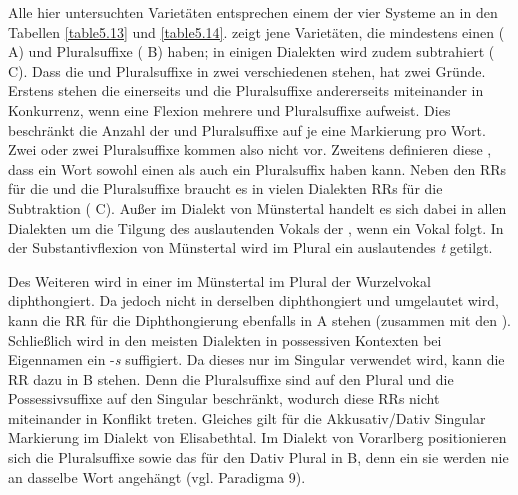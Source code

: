 Alle hier untersuchten Varietäten entsprechen einem der vier Systeme an  in den Tabellen \ref{table5.13} und \ref{table5.14}.  zeigt jene Varietäten, die mindestens einen  ( A) und Pluralsuffixe ( B) haben; in einigen Dialekten wird zudem subtrahiert ( C). Dass die  und Pluralsuffixe in zwei verschiedenen  stehen, hat zwei Gründe. Erstens stehen die  einerseits und die Pluralsuffixe andererseits miteinander in Konkurrenz, wenn eine Flexion mehrere  und Pluralsuffixe aufweist. Dies beschränkt die Anzahl der  und Pluralsuffixe auf je eine Markierung pro Wort. Zwei  oder zwei Pluralsuffixe kommen also nicht vor. Zweitens definieren diese , dass ein Wort sowohl einen  als auch ein Pluralsuffix haben kann. Neben den RRs für die  und die Pluralsuffixe braucht es in vielen Dialekten RRs für die Subtraktion ( C). Außer im Dialekt von Münstertal handelt es sich dabei in allen Dialekten um die Tilgung des auslautenden Vokals der , wenn ein Vokal folgt. In der Substantivflexion von Münstertal wird im Plural ein auslautendes \textit{t} getilgt.

Des Weiteren wird in einer  im Münstertal im Plural der Wurzelvokal diphthongiert. Da jedoch nicht in derselben  diphthongiert und umgelautet wird, kann die RR für die Diphthongierung ebenfalls in  A stehen (zusammen mit den ). Schließlich wird in den meisten Dialekten in possessiven Kontexten bei Eigennamen ein -\textit{s} suffigiert. Da dieses  nur im Singular verwendet wird, kann die RR dazu in  B stehen. Denn die Pluralsuffixe sind auf den Plural und die Possessivsuffixe auf den Singular beschränkt, wodurch diese RRs nicht miteinander in Konflikt treten. Gleiches gilt für die Akkusativ/Dativ Singular Markierung im Dialekt von Elisabethtal. Im Dialekt von Vorarlberg positionieren sich die Pluralsuffixe sowie das  für den Dativ Plural in  B, denn ein sie werden nie an dasselbe Wort angehängt (vgl. Paradigma 9).


